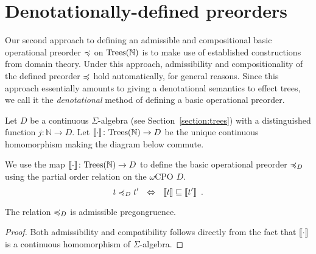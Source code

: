 \section{Denotationally-defined preorders}
\label{section:denotational}

Our second approach to defining an admissible and compositional basic operational
preorder $\preccurlyeq$ on $\textnormal{Trees}(\mathbb{N})$ is to make use of established constructions from domain theory.
Under this approach, admissibility and compositionality of the defined preorder $\preccurlyeq$ hold automatically,
for general reasons. Since this approach essentially amounts to giving a denotational semantics to effect trees, we call it the 
\emph{denotational} method of defining a basic operational preorder.

Let $D$ be a continuous $\Sigma$-algebra (see Section~\ref{section:trees}) with a distinguished function 
$j\colon \mathbb{N} \to D$. Let   $\llbracket \cdot \rrbracket \colon \textnormal{Trees}(\mathbb{N}) \to D$ be the unique continuous homomorphism
making the diagram below commute.
   \begin{center}
    \end{center}
\noindent
We use the map $\llbracket \cdot \rrbracket \colon \textnormal{Trees}(\mathbb{N}) \to D$ to define 
the basic operational preorder $\preccurlyeq_D$ using the partial order relation on the $\omega$CPO $D$.
\[
t \preccurlyeq_D t' ~~ \Leftrightarrow ~~ \llbracket t \rrbracket \sqsubseteq \llbracket t'  \rrbracket \enspace .
\]
\begin{proposition}
The relation $\preccurlyeq_D$ is admissible pregongruence.
\end{proposition}

\begin{proof}
    Both admissibility and compatibility follows directly from the 
    fact that $\llbracket \cdot \rrbracket$ is a continuous 
    homomorphism of $\Sigma$-algebra.
\end{proof}

